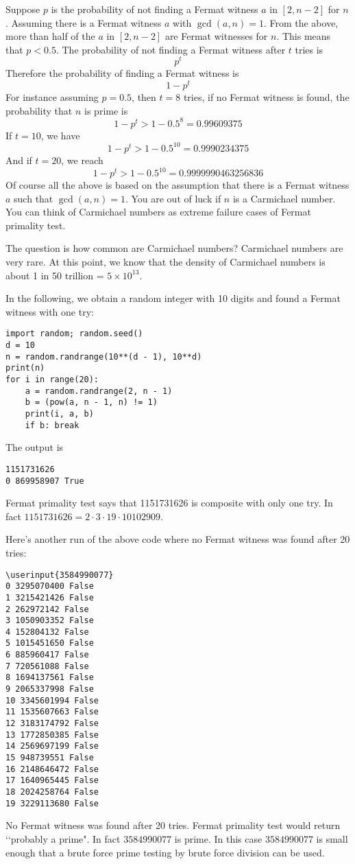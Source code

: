 Suppose $p$ is the probability of not finding a Fermat witness
$a$ in $[2, n-2]$ for $n$.
Assuming there is a Fermat witness $a$ with $\gcd(a, n) = 1$.
From the above, more than half of the $a$ in $[2, n - 2]$ are Fermat
witnesses for $n$.
This means that $p < 0.5$.
The probability of not finding a Fermat witness after $t$ tries is
\[
p^{t}
\]
Therefore the probability of finding a Fermat witness is
\[
1 - p^t
\]
For instance assuming $p = 0.5$, then $t=8$ tries,
if no Fermat witness is found, the probability that $n$ is prime is
\[
1 - p^t > 1 - 0.5^8 = 0.99609375
\]
If $t = 10$, we have
\[
1 - p^t > 1 - 0.5^{10} = 0.9990234375
\]
And if $t = 20$, we reach
\[
1 - p^t > 1 - 0.5^{10} = 0.9999990463256836
\]
Of course all the above is based on the assumption that there is
a Fermat witness $a$ such that $\gcd(a, n) = 1$.
You are out of luck if $n$ is a Carmichael number.
You can think of Carmichael numbers as extreme failure cases of Fermat
primality test.

The question is how common are Carmichael numbers?
Carmichael numbers are very rare.
At this point, we know that the density of Carmichael numbers
is about 1 in 50 trillion = $5 \times 10^{13}$.

\begin{eg}
In the following, we obtain a random integer with 10 digits
and found a Fermat witness with one try:
\begin{Verbatim}[fontsize=\footnotesize,frame=single]
import random; random.seed()
d = 10
n = random.randrange(10**(d - 1), 10**d)
print(n)
for i in range(20):
    a = random.randrange(2, n - 1)
    b = (pow(a, n - 1, n) != 1)
    print(i, a, b)
    if b: break
\end{Verbatim}
The output is
\begin{Verbatim}[fontsize=\footnotesize,frame=single]
1151731626
0 869958907 True
\end{Verbatim}
Fermat primality test says that 1151731626 is composite with only one try.
In fact $1151731626 = 2 \cdot 3 \cdot 19 \cdot 10102909$.
\end{eg}

\begin{eg}
Here's another run of the above code where no Fermat witness was found
after 20 tries:
\begin{Verbatim}[fontsize=\footnotesize,frame=single,commandchars=\\\{\}]
\userinput{3584990077}
0 3295070400 False
1 3215421426 False
2 262972142 False
3 1050903352 False
4 152804132 False
5 1015451650 False
6 885960417 False
7 720561088 False
8 1694137561 False
9 2065337998 False
10 3345601994 False
11 1535607663 False
12 3183174792 False
13 1772850385 False
14 2569697199 False
15 948739551 False
16 2148646472 False
17 1640965445 False
18 2024258764 False
19 3229113680 False
\end{Verbatim}
No Fermat witness was found after 20 tries.
Fermat primality test would return \lq\lq probably a prime".
In fact $3584990077$ is prime.
In this case $3584990077$ is small enough that a brute force
prime testing by brute force division can be used.
\end{eg}

